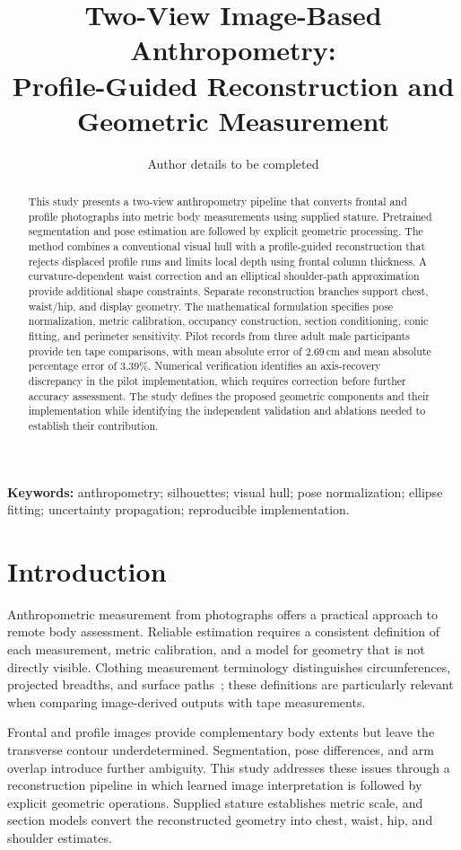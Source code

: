 \documentclass[11pt,a4paper]{article}
\title{Two-View Image-Based Anthropometry:\\
Profile-Guided Reconstruction and Geometric Measurement}
\author{Author details to be completed}
\date{}
\numberwithin{equation}{section}
\begin{document}
\maketitle

\begin{abstract}
This study presents a two-view anthropometry pipeline that converts frontal and profile photographs into metric body measurements using supplied stature. Pretrained segmentation and pose estimation are followed by explicit geometric processing. The method combines a conventional visual hull with a profile-guided reconstruction that rejects displaced profile runs and limits local depth using frontal column thickness. A curvature-dependent waist correction and an elliptical shoulder-path approximation provide additional shape constraints. Separate reconstruction branches support chest, waist/hip, and display geometry. The mathematical formulation specifies pose normalization, metric calibration, occupancy construction, section conditioning, conic fitting, and perimeter sensitivity. Pilot records from three adult male participants provide ten tape comparisons, with mean absolute error of $2.69$\,cm and mean absolute percentage error of $3.39\%$. Numerical verification identifies an axis-recovery discrepancy in the pilot implementation, which requires correction before further accuracy assessment. The study defines the proposed geometric components and their implementation while identifying the independent validation and ablations needed to establish their contribution.

\end{abstract}

\noindent\textbf{Keywords:} anthropometry; silhouettes; visual hull; pose normalization; ellipse fitting; uncertainty propagation; reproducible implementation.

\section{Introduction}
Anthropometric measurement from photographs offers a practical approach to remote body assessment. Reliable estimation requires a consistent definition of each measurement, metric calibration, and a model for geometry that is not directly visible. Clothing measurement terminology distinguishes circumferences, projected breadths, and surface paths~\cite{iso8559}; these definitions are particularly relevant when comparing image-derived outputs with tape measurements.

Frontal and profile images provide complementary body extents but leave the transverse contour underdetermined. Segmentation, pose differences, and arm overlap introduce further ambiguity. This study addresses these issues through a reconstruction pipeline in which learned image interpretation is followed by explicit geometric operations. Supplied stature establishes metric scale, and section models convert the reconstructed geometry into chest, waist, hip, and shoulder estimates.
\end{document}
